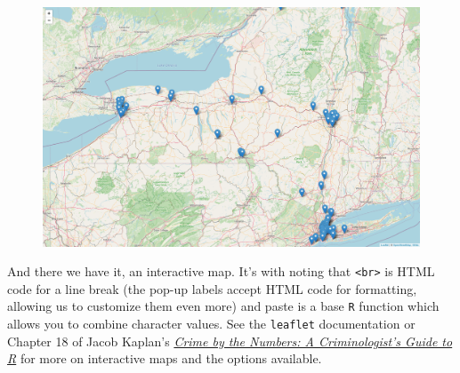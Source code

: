\documentclass[
  letterpaper,
]{book}
\newenvironment{Shaded}{\begin{snugshade}}{\end{snugshade}}
\newcommand{\AttributeTok}[1]{\textcolor[rgb]{0.40,0.45,0.13}{#1}}
\newcommand{\CommentTok}[1]{\textcolor[rgb]{0.37,0.37,0.37}{#1}}
\newcommand{\FunctionTok}[1]{\textcolor[rgb]{0.28,0.35,0.67}{#1}}
\newcommand{\NormalTok}[1]{\textcolor[rgb]{0.00,0.23,0.31}{#1}}
\newcommand{\SpecialCharTok}[1]{\textcolor[rgb]{0.37,0.37,0.37}{#1}}
\newcommand{\StringTok}[1]{\textcolor[rgb]{0.13,0.47,0.30}{#1}}
\begin{document}
\begin{Shaded}
\end{Shaded}

\begin{figure}[H]

{\centering \includegraphics{scraping-and-maps_files/figure-pdf/unnamed-chunk-17-1.png}

}

\end{figure}

And there we have it, an interactive map. It's with noting that
\texttt{\textless{}br\textgreater{}} is HTML code for a line break (the
pop-up labels accept HTML code for formatting, allowing us to customize
them even more) and paste is a base \texttt{R} function which allows you
to combine character values. See the \texttt{leaflet} documentation or
Chapter 18 of Jacob Kaplan's
\href{https://crimebythenumbers.com/interactive-maps.html}{\emph{Crime
by the Numbers: A Criminologist's Guide to R}} for more on interactive
maps and the options available.
\end{document}
